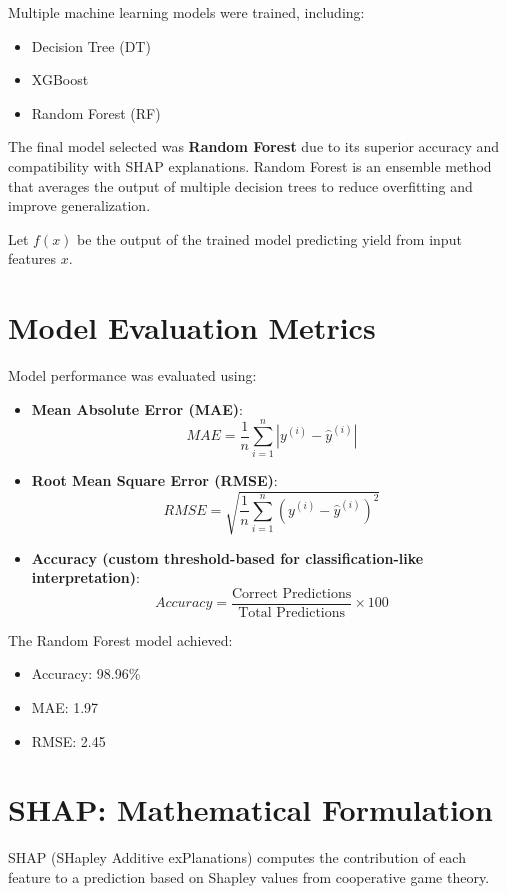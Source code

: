 \documentclass[a4paper,11pt,oneside]{book}
\begin{document}
Multiple machine learning models were trained, including:
\begin{itemize}
    \item Decision Tree (DT)
    \item XGBoost
    \item Random Forest (RF)
\end{itemize}

The final model selected was \textbf{Random Forest} due to its superior accuracy and compatibility with SHAP explanations. Random Forest is an ensemble method that averages the output of multiple decision trees to reduce overfitting and improve generalization.

Let \(f(x)\) be the output of the trained model predicting yield from input features \(x\).

\section{Model Evaluation Metrics}

Model performance was evaluated using:

\begin{itemize}
    \item \textbf{Mean Absolute Error (MAE)}:
    \[
    MAE = \frac{1}{n} \sum_{i=1}^{n} |y^{(i)} - \hat{y}^{(i)}|
    \]
    \item \textbf{Root Mean Square Error (RMSE)}:
    \[
    RMSE = \sqrt{\frac{1}{n} \sum_{i=1}^{n} (y^{(i)} - \hat{y}^{(i)})^2}
    \]
    \item \textbf{Accuracy (custom threshold-based for classification-like interpretation)}:
    \[
    Accuracy = \frac{\text{Correct Predictions}}{\text{Total Predictions}} \times 100
    \]
\end{itemize}

The Random Forest model achieved:
\begin{itemize}
    \item Accuracy: 98.96\%
    \item MAE: 1.97
    \item RMSE: 2.45
\end{itemize}

\section{SHAP: Mathematical Formulation}

SHAP (SHapley Additive exPlanations) computes the contribution of each feature to a prediction based on Shapley values from cooperative game theory.
\end{document}

